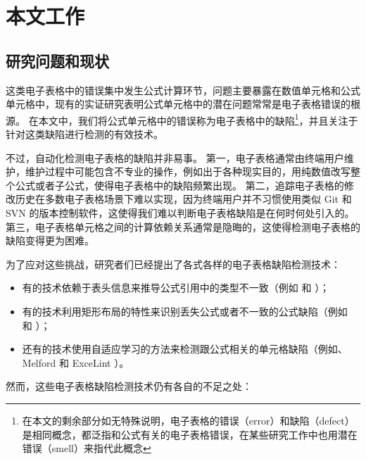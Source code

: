 \section{本文工作}

\subsection{研究问题和现状}

这类电子表格中的错误集中发生公式计算环节，问题主要暴露在数值单元格和公式单元格中，现有的实证研究\cite{panko2010revising}表明公式单元格中的潜在问题常常是电子表格错误的根源。
在本文中，我们将公式单元格中的错误称为电子表格中的缺陷\footnote{在本文的剩余部分如无特殊说明，电子表格的错误（error）和缺陷（defect）是相同概念，都泛指和公式有关的电子表格错误，在某些研究工作中也用潜在错误（smell）来指代此概念}，并且关注于针对这类缺陷进行检测的有效技术。

不过，自动化检测电子表格的缺陷并非易事。
第一，电子表格通常由终端用户维护，维护过程中可能包含不专业的操作，例如出于各种现实目的，用纯数值改写整个公式或者子公式，使得电子表格中的缺陷频繁出现。
第二，追踪电子表格的修改历史在多数电子表格场景下难以实现，因为终端用户并不习惯使用类似 Git 和 SVN 的版本控制软件，这使得我们难以判断电子表格缺陷是在何时何处引入的。
第三，电子表格单元格之间的计算依赖关系通常是隐晦的，这使得检测电子表格的缺陷变得更为困难。

为了应对这些挑战，研究者们已经提出了各式各样的电子表格缺陷检测技术：

\begin{itemize}
    \item 有的技术依赖于表头信息来推导公式引用中的类型不一致（例如\uc \cite{abraham2007ucheck} 和 \di \cite{chambers2009automatic}）；
    \item 有的技术利用矩形布局的特性来识别丢失公式或者不一致的公式缺陷（例如\am \cite{dou2014spreadsheet} 和 \ca \cite{dou2017cacheck}）；
    \item 还有的技术使用自适应学习的方法来检测跟公式相关的单元格缺陷（例如\cu \cite{cheung2016custodes}、Melford\cite{singh2017melford} 和 ExceLint \cite{Barowy2018excelint}）。
\end{itemize}

然而，这些电子表格缺陷检测技术仍有各自的不足之处：

